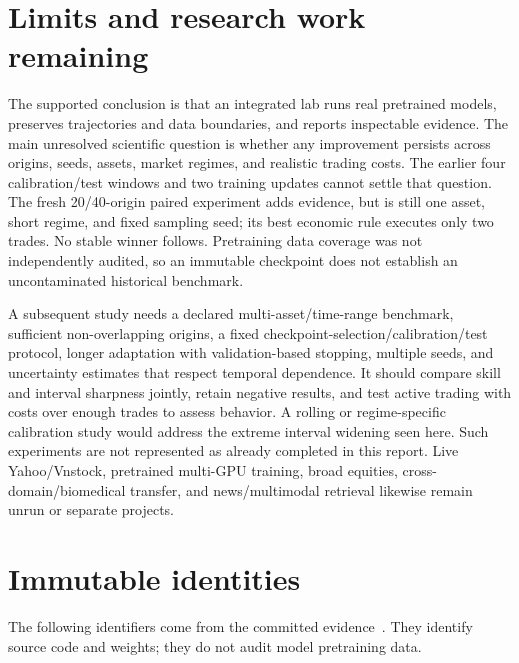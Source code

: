 \documentclass[11pt,a4paper]{article}
\begin{document}
\section{Limits and research work remaining}
The supported conclusion is that an integrated lab runs real pretrained models,
preserves trajectories and data boundaries, and reports inspectable evidence.
The main unresolved scientific question is whether any improvement persists
across origins, seeds, assets, market regimes, and realistic trading costs.
The earlier four calibration/test windows and two training updates cannot settle
that question. The fresh 20/40-origin paired experiment adds evidence, but is
still one asset, short regime, and fixed sampling seed; its best economic rule
executes only two trades. No stable winner follows. Pretraining data coverage
was not independently audited, so an immutable checkpoint does not establish
an uncontaminated historical benchmark.

A subsequent study needs a declared multi-asset/time-range benchmark, sufficient
non-overlapping origins, a fixed checkpoint-selection/calibration/test protocol,
longer adaptation with validation-based stopping, multiple seeds, and uncertainty
estimates that respect temporal dependence. It should compare skill and interval
sharpness jointly, retain negative results, and test active trading with costs
over enough trades to assess behavior. A rolling or regime-specific calibration
study would address the extreme interval widening seen here. Such experiments
are not represented as already completed in this report. Live Yahoo/Vnstock,
pretrained multi-GPU training, broad equities, cross-domain/biomedical transfer,
and news/multimodal retrieval likewise remain unrun or separate projects.

\appendix
\section{Immutable identities}\label{app:identities}
The following identifiers come from the committed evidence~\cite{evidence}.
They identify source code and weights; they do not audit model pretraining data.
\end{document}
